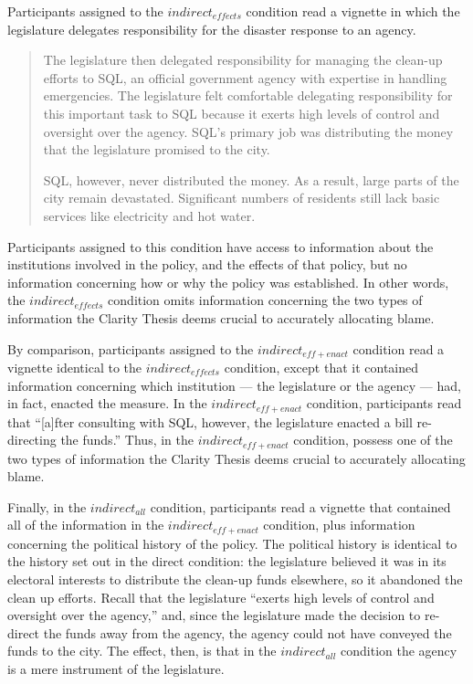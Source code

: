 \documentclass{article}
\begin{document}
Participants assigned to the $indirect_{effects}$ condition read a vignette in which the legislature delegates responsibility for the disaster response to an agency.

\begin{quotation}

The legislature then delegated responsibility for managing the clean-up efforts to SQL, an official government agency with expertise in handling emergencies. The legislature felt comfortable delegating responsibility for this important task to SQL because it exerts high levels of control and oversight over the agency. SQL's primary job was distributing the money that the legislature promised to the city. 
 
SQL, however, never distributed the money. As a result, large parts of the city remain devastated. Significant numbers of residents still lack basic services like electricity and hot water.

\end{quotation}

Participants assigned to this condition have access to information about the institutions involved in the policy, and the effects of that policy, but no information concerning how or why the policy was established. In other words, the $indirect_{effects}$ condition omits information concerning the two types of information the Clarity Thesis deems crucial to accurately allocating blame. 

By comparison, participants assigned to the $indirect_{eff+enact}$ condition read a vignette identical to the $indirect_{effects}$ condition, except that it contained information concerning which institution --- the legislature or the agency --- had, in fact, enacted the measure. In the $indirect_{eff+enact}$ condition, participants read that ``[a]fter consulting with SQL, however, the legislature enacted a bill re-directing the funds.'' Thus, in the $indirect_{eff+enact}$ condition, possess one of the two types of information the Clarity Thesis deems crucial to accurately allocating blame. 

Finally, in the $indirect_{all}$ condition, participants read a vignette that contained all of the information in the $indirect_{eff+enact}$ condition, plus information concerning the political history of the policy. The political history is identical to the history set out in the direct condition: the legislature believed it was in its electoral interests to distribute the clean-up funds elsewhere, so it abandoned the clean up efforts. Recall that the legislature ``exerts high levels of control and oversight over the agency,'' and, since the legislature made the decision to re-direct the funds away from the agency, the agency could not have conveyed the funds to the city. The effect, then, is that in the $indirect_{all}$ condition the agency is a mere instrument of the legislature. 
\end{document}
